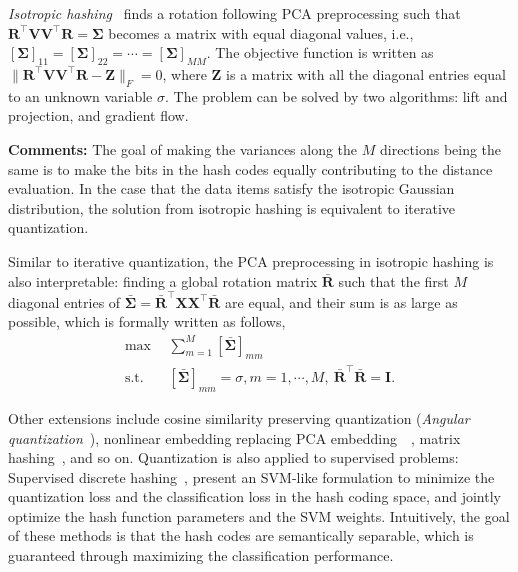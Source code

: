\documentclass[10pt,journal,compsoc]{IEEEtran}
\begin{document}
\emph{Isotropic hashing}~\cite{KongL12a}
finds a rotation following PCA preprocessing
such that
$\mathbf{R}^\top\mathbf{V}\mathbf{V}^\top\mathbf{R} = \boldsymbol{\Sigma}$
becomes a matrix with equal diagonal values,
i.e.,
$[\boldsymbol{\Sigma}]_{11} = [\boldsymbol{\Sigma}]_{22} = \cdots = [\boldsymbol{\Sigma}]_{MM}$.
The objective function is written as
$\|\mathbf{R}^\top\mathbf{V}\mathbf{V}^\top\mathbf{R} - \mathbf{Z}\|_F = 0$,
where $\mathbf{Z}$ is a matrix with all the diagonal entries equal to an unknown variable $\sigma$.
The problem can be solved by two algorithms: lift and projection, and gradient flow.



\textbf{Comments:}
The goal of making the variances along the $M$ directions being the same
is to make the bits in the hash codes equally contributing to the distance evaluation.
In the case that
the data items satisfy the isotropic Gaussian distribution,
the solution from isotropic hashing is equivalent to iterative quantization.

Similar to iterative quantization,
the PCA preprocessing in isotropic hashing is also interpretable:
finding a global rotation matrix $\bar{\mathbf{R}}$ such that
the first $M$ diagonal entries of $\bar{\boldsymbol{\Sigma}} = \bar{\mathbf{R}}^\top\mathbf{X}\mathbf{X}^\top\bar{\mathbf{R}}$
are equal,
and their sum is as large as possible,
which is formally written as follows,
\begin{align}
\max ~&~ \sum\nolimits_{m=1}^M [\bar{\boldsymbol{\Sigma}}]_{mm} \\
\operatorname{s.t.}
~&~ [\bar{\boldsymbol{\Sigma}}]_{mm} = \sigma, m=1,\cdots,M ,~
\bar{\mathbf{R}}^\top\bar{\mathbf{R}} = \mathbf{I}.
\end{align}

Other extensions include
cosine similarity preserving quantization
(\emph{Angular quantization}~\cite{GongKVL12}),
nonlinear embedding replacing PCA embedding~\cite{IrieLWC14}~\cite{ZhaoLM14},
matrix hashing~\cite{GongKRL13},
and so on.
Quantization is also applied to supervised problems:
Supervised discrete hashing~\cite{ShenSLS15, ShenZ0SST16, ZhangZSLC16, ZhangLGZ16},
present an SVM-like formulation
to minimize the quantization loss
and the classification loss in the hash coding space,
and jointly optimize the hash function parameters
and the SVM weights.
Intuitively, the goal of these methods
is that the hash codes are semantically separable,
which is guaranteed through maximizing the classification performance.
\end{document}
